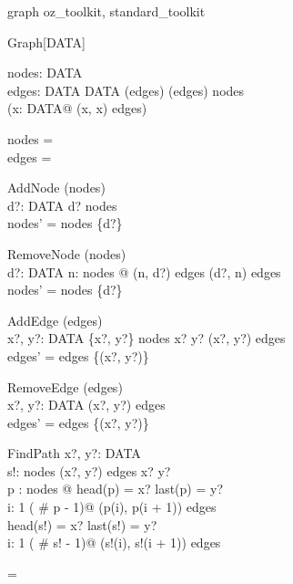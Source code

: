 \documentclass[11pt]{article}
\begin{document}
\begin{zsection}
  \SECTION graph \parents oz\_toolkit, standard\_toolkit
\end{zsection}

\zedindent=2mm
\begin{class}{Graph[DATA]}
\also
\begin{state}
nodes:  \finset DATA \\ 
edges: DATA \rel DATA
\where
 \dom (edges) \cup  \ran (edges) \subseteq nodes \\ 
 \lnot (\exists x: DATA@ (x, x) \in edges)
\end{state}\classbreak
\begin{init}
nodes = \emptyset \\ 
edges = \emptyset
\end{init} \classbreak
\begin{op}{AddNode}
\Delta(nodes)\\
d?: DATA 
\where
 d? \notin nodes \\ 
 nodes' = nodes \cup \{d?\} 
\end{op} \classbreak
\begin{op}{RemoveNode}
\Delta (nodes)\\
d?: DATA 
\where
  \lnot \exists n: nodes @ (n, d?) \in edges \lor 
    (d?, n) \in edges\\ 
 nodes' = nodes \setminus \{d?\} 
\end{op} \classbreak
\begin{op}{AddEdge}
\Delta (edges)\\
x?, y?: DATA 
\where
 \{x?, y?\} \subseteq nodes \land  x? \neq y? \land 
         (x?, y?) \notin edges \\ 
 edges' = edges \cup \{(x?, y?)\} 
\end{op}\classbreak
\begin{op}{RemoveEdge}
\Delta (edges)\\
x?, y?: DATA 
\where
 (x?, y?) \in edges \\ 
 edges' = edges \setminus \{(x?, y?)\} \\ 
\end{op} \classbreak
\begin{op}{FindPath}
x?, y?: DATA \\ 
s!:  \iseq nodes 
\where
 (x?, y?) \in edges \plus  \land x? \neq y? \land\\
       \exists p : \iseq nodes @ head(p) = x? \land last(p) = y? \land\\
       \forall i: 1 \upto ( \# p - 1)@ (p(i), p(i + 1)) \in edges \\ 
 head(s!) = x? \land last(s!) = y?\\ 
\forall i: 1 \upto ( \# s! - 1)@ (s!(i), s!(i + 1)) \in edges 
\end{op} 
\end{class} 
\zedindent=\leftmargini
\end{document}
